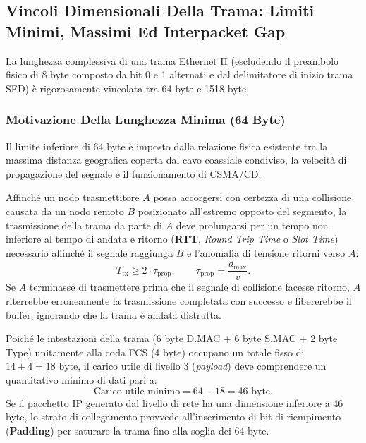 \documentclass[11pt, a4paper]{article}
\begin{document}
\subsection{Vincoli Dimensionali Della Trama: Limiti Minimi, Massimi Ed Interpacket Gap}

La lunghezza complessiva di una trama Ethernet II (escludendo il preambolo fisico di 8 byte composto da bit 0 e 1 alternati e dal delimitatore di inizio trama SFD) è rigorosamente vincolata tra 64 byte e 1518 byte.

\subsubsection{Motivazione Della Lunghezza Minima (64 Byte)}
Il limite inferiore di 64 byte è imposto dalla relazione fisica esistente tra la massima distanza geografica coperta dal cavo coassiale condiviso, la velocità di propagazione del segnale e il funzionamento di CSMA/CD.

Affinché un nodo trasmettitore $A$ possa accorgersi con certezza di una collisione causata da un nodo remoto $B$ posizionato all'estremo opposto del segmento, la trasmissione della trama da parte di $A$ deve prolungarsi per un tempo non inferiore al tempo di andata e ritorno (\textbf{RTT}, \emph{Round Trip Time} o \emph{Slot Time}) necessario affinché il segnale raggiunga $B$ e l'anomalia di tensione ritorni verso $A$:
\begin{equation}
    T_{\text{tx}} \ge 2 \cdot \tau_{\text{prop}}, \qquad \tau_{\text{prop}} = \frac{d_{\max}}{v}.
\end{equation}
Se $A$ terminasse di trasmettere prima che il segnale di collisione facesse ritorno, $A$ riterrebbe erroneamente la trasmissione completata con successo e libererebbe il buffer, ignorando che la trama è andata distrutta.

Poiché le intestazioni della trama (6 byte D.MAC + 6 byte S.MAC + 2 byte Type) unitamente alla coda FCS (4 byte) occupano un totale fisso di $14 + 4 = 18\text{ byte}$, il carico utile di livello 3 (\emph{payload}) deve comprendere un quantitativo minimo di dati pari a:
\begin{equation}
    \text{Carico utile minimo} = 64 - 18 = 46\text{ byte}.
\end{equation}
Se il pacchetto IP generato dal livello di rete ha una dimensione inferiore a 46 byte, lo strato di collegamento provvede all'inserimento di bit di riempimento (\textbf{Padding}) per saturare la trama fino alla soglia dei 64 byte.
\end{document}
